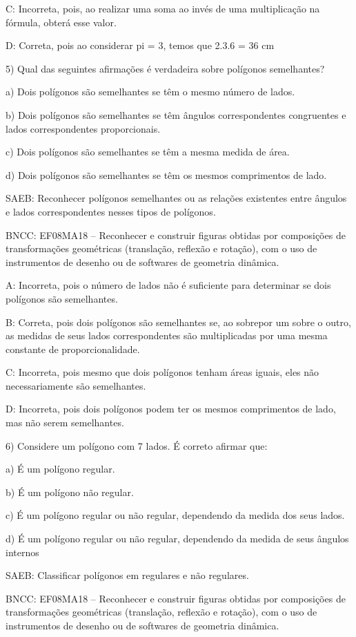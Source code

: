 C: Incorreta, pois, ao realizar uma soma ao invés de uma multiplicação
na fórmula, obterá esse valor.

D: Correta, pois ao considerar pi = 3, temos que 2.3.6 = 36 cm

5) Qual das seguintes afirmações é verdadeira sobre polígonos
semelhantes?

a) Dois polígonos são semelhantes se têm o mesmo número de lados.

b) Dois polígonos são semelhantes se têm ângulos correspondentes
congruentes e lados correspondentes proporcionais.

c) Dois polígonos são semelhantes se têm a mesma medida de área.

d) Dois polígonos são semelhantes se têm os mesmos comprimentos de lado.

SAEB: Reconhecer polígonos semelhantes ou as relações existentes entre
ângulos e lados correspondentes nesses tipos de polígonos.

BNCC: EF08MA18 -- Reconhecer e construir figuras obtidas por composições
de transformações geométricas (translação, reflexão e rotação), com o
uso de instrumentos de desenho ou de softwares de geometria dinâmica.

A: Incorreta, pois o número de lados não é suficiente para determinar se
dois polígonos são semelhantes.

B: Correta, pois dois polígonos são semelhantes se, ao sobrepor um sobre
o outro, as medidas de seus lados correspondentes são multiplicadas por
uma mesma constante de proporcionalidade.

C: Incorreta, pois mesmo que dois polígonos tenham áreas iguais, eles
não necessariamente são semelhantes.

D: Incorreta, pois dois polígonos podem ter os mesmos comprimentos de
lado, mas não serem semelhantes.

6) Considere um polígono com 7 lados. É correto afirmar que:

a) É um polígono regular.

b) É um polígono não regular.

c) É um polígono regular ou não regular, dependendo da medida dos seus
lados.

d) É um polígono regular ou não regular, dependendo da medida de seus
ângulos internos

SAEB: Classificar polígonos em regulares e não regulares.

BNCC: EF08MA18 -- Reconhecer e construir figuras obtidas por composições
de transformações geométricas (translação, reflexão e rotação), com o
uso de instrumentos de desenho ou de softwares de geometria dinâmica.


